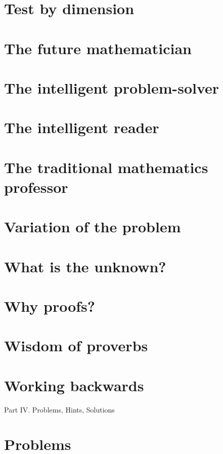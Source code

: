 \documentclass[oneside]{book}
\numberwithin{equation}{section}
\begin{document}
\section*{Test by dimension}

\section*{The future mathematician}

\section*{The intelligent problem-solver}

\section*{The intelligent reader}

\section*{The traditional mathematics professor}

\section*{Variation of the problem}

\section*{What is the unknown?}

\section*{Why proofs?}

\section*{Wisdom of proverbs}

\section*{Working backwards}

\begin{center}
	\huge Part IV. Problems, Hints, Solutions
\end{center}

\section*{Problems}
\end{document}
